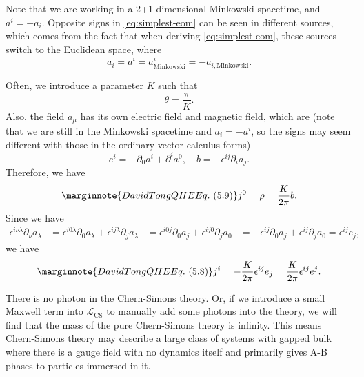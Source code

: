\documentclass[hyperref, a4paper]{article}
\def\\{}%
\begin{document}
\begin{note*}{}
    Note that we are working in a 2+1 dimensional Minkowski spacetime, and $a^i = - a_i$. 
    Opposite signs in \eqref{eq:simplest-eom} can be seen in different sources, which comes from 
    the fact that when deriving \eqref{eq:simplest-eom}, these sources switch to the Euclidean 
    space, where 
    \[
        a_i = a^i = a^i_\text{Minkowski} = - a_{i, \text{Minkowski}}.
    \]
\end{note*}

Often, we introduce a parameter $K$ such that  
\begin{equation}
    \theta = \frac{\pi}{K}.
\end{equation}
Also, the field $a_\mu$ has its own electric field and magnetic field, which are (note that we are still in the Minkowski spacetime and $a_i = - a^i$, so the signs may seem different with those in the ordinary vector calculus forms)
\begin{equation}
    e^i = - \partial_0 a^i + \partial^i a^0, \quad b = - \epsilon^{ij} \partial_i a_j.
\end{equation}
Therefore, we have 
\begin{equation} \marginnote{David Tong QHE Eq.~(5.9)}
    j^0 = \rho = \frac{K}{2\pi} b.
    \label{eq:charge-flux-composite}
\end{equation}
Since we have 
\[
    \begin{aligned}
        \epsilon^{i \nu \lambda} \partial_\nu a_\lambda &= \epsilon^{i 0 \lambda} \partial_0 a_\lambda + \epsilon^{i j \lambda} \partial_j a_\lambda \\
        &= \epsilon^{i 0 j} \partial_0 a_j + \epsilon^{i j 0} \partial_j a_0 \\ 
        &= - \epsilon^{ij} \partial_0 a_j + \epsilon^{ij}  \partial_j a_0 = \epsilon^{ij} e_j ,
    \end{aligned}
\]
we have 
\begin{equation} \marginnote{David Tong QHE Eq.~(5.8)}
    j^i = - \frac{K}{2\pi} \epsilon^{ij} e_j = \frac{K}{2\pi} \epsilon^{ij} e^j.
    \label{eq:current-from-electric-field-chern-simons}
\end{equation}

There is no photon in the Chern-Simons theory. Or, if we introduce a small Maxwell term into  
$\mathcal{L}_\text{CS}$ to manually add some photons into the theory, we will find that the mass of the 
pure Chern-Simons theory is infinity. 
This means Chern-Simons theory may describe a large class of systems with gapped bulk where there 
is a gauge field with no dynamics itself and primarily gives A-B phases to particles immersed in it.
\end{document}
